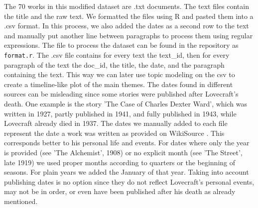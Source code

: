 The 70 works in this modified dataset are .txt documents. The text files contain the title and 
the raw text. We formatted the files using R and pasted them into a .csv format. In this process, 
we also added the dates as a second row to the text and manually put another line between 
paragraphs to process them using regular expressions. The file to process the dataset can be 
found in the repository as \texttt{format.r}. The .csv file contains for every text the text\_id, then 
for every paragraph of the text the doc\_id, the title, the date, and the paragraph containing 
the text. This way we can later use topic modeling on the csv to create a timeline-like plot of 
the main themes. The dates found in different sources can be misleading since some stories were 
published after Lovecraft's death. One example is the story 'The Case of Charles Dexter Ward', 
which was written in 1927, partly published in 1941, and fully published in 1943, while Lovecraft 
already died in 1937. The dates we manually added to each file represent the date a work was 
written as provided on WikiSource \cite{wiki}. This corresponds better to his personal life and events. For 
dates where only the year is provided (see 'The Alchemist', 1908) or no explicit month 
(see 'The Street', late 1919) we used proper months according to quarters or the beginning of 
seasons. For plain years we added the January of that year. Taking into account publishing dates 
is no option since they do not reflect Lovecraft's personal events, may not be in order, or even 
have been published after his death as already mentioned.